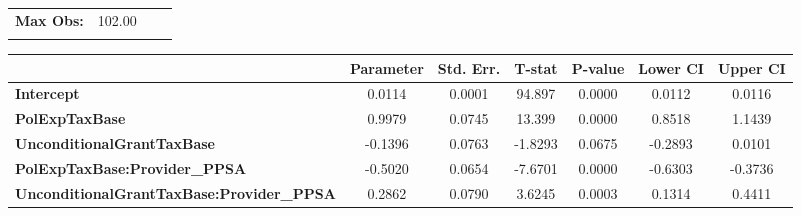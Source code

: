 \begin{center}
\begin{tabular}{lclc}
\textbf{Max Obs:}                                 &       102.00       & \textbf{                     }   &                  \\
\textbf{}                                         &                    & \textbf{                     }   &                  \\
\bottomrule
\end{tabular}
\begin{tabular}{lcccccc}
                                                  & \textbf{Parameter} & \textbf{Std. Err.} & \textbf{T-stat} & \textbf{P-value} & \textbf{Lower CI} & \textbf{Upper CI}  \\
\midrule
\textbf{Intercept}                                &       0.0114       &       0.0001       &      94.897     &      0.0000      &       0.0112      &       0.0116       \\
\textbf{PolExpTaxBase}                            &       0.9979       &       0.0745       &      13.399     &      0.0000      &       0.8518      &       1.1439       \\
\textbf{UnconditionalGrantTaxBase}                &      -0.1396       &       0.0763       &     -1.8293     &      0.0675      &      -0.2893      &       0.0101       \\
\textbf{PolExpTaxBase:Provider\_PPSA}             &      -0.5020       &       0.0654       &     -7.6701     &      0.0000      &      -0.6303      &      -0.3736       \\
\textbf{UnconditionalGrantTaxBase:Provider\_PPSA} &       0.2862       &       0.0790       &      3.6245     &      0.0003      &       0.1314      &       0.4411       \\
\bottomrule
\end{tabular}
\end{center}